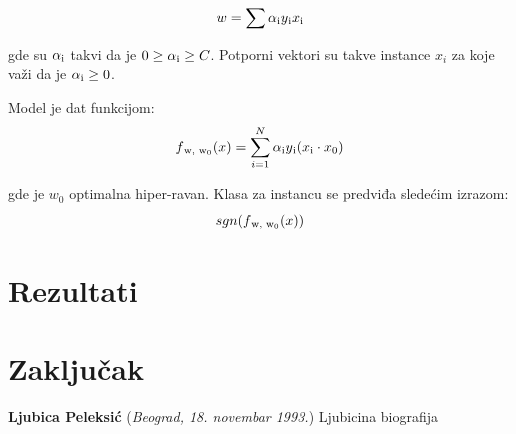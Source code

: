 \documentclass[12pt,oneside]{memoir}
\begin{document}
\begin{equation}
	w = \sum \alpha\textsubscript{i}y\textsubscript{i}x\textsubscript{i}
\end{equation}

gde su $\alpha\textsubscript{i}$ takvi da je $0 \geq \alpha\textsubscript{i} \geq C$. Potporni vektori su takve instance $x_i$ za koje važi da je $\alpha\textsubscript{i} \geq 0$. 

Model je dat funkcijom:
\begin{equation}
	f\textsubscript{w, w\textsubscript{0}}(x) = \sum_{i=1}^{N} \alpha\textsubscript{i}y\textsubscript{i}(x\textsubscript{i} \cdot x\textsubscript{0})
\end{equation}

gde je $w_0$ optimalna hiper-ravan.  Klasa za instancu se predviđa sledećim izrazom:
\begin{equation}
	sgn(f\textsubscript{w, w\textsubscript{0}}(x))
\end{equation}

\chapter{Rezultati}



\chapter{Zaključak}





% 





\backmatter


\begin{biografija}
  \textbf{Ljubica Peleksić} (\emph{Beograd,
    18.  novembar 1993.}) 
	Ljubicina biografija
\end{biografija}
\end{document}
